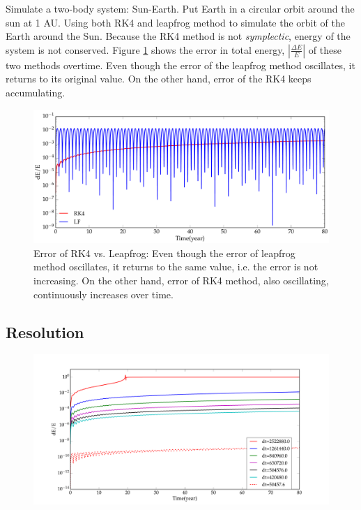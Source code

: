 \documentclass[11pt,letterpaper]{article}
\begin{document}
Simulate a two-body system: Sun-Earth. Put Earth in a circular orbit around the sun at 1 AU. Using both RK4 and leapfrog method to simulate the orbit of the Earth around the Sun. Because the RK4 method is not \emph{symplectic}, energy of the system is not conserved. Figure \ref{fig:AddedError} shows the error in total energy, $\left | \frac{\Delta E}{E} \right |$ of these two methods overtime. Even though the error of the leapfrog method oscillates, it returns to its original value. On the other hand, error of the RK4 keeps accumulating.

\begin{figure}[h!]
	\centering
	\includegraphics[height = 0.3\textheight]{AddedError}
	\caption{Error of RK4 vs. Leapfrog: Even though the error of leapfrog method oscillates, it returns to the same value, i.e. the error is not increasing. On the other hand, error of RK4 method, also oscillating, continuously increases over time.}
	\label{fig:AddedError}
\end{figure}

\subsection{Resolution}

\begin{figure}[h!]
	\centering
	\includegraphics[height = 0.4\textheight]{Resolution}
	\caption{}
	\label{fig:Resolution}
\end{figure}
\end{document}

